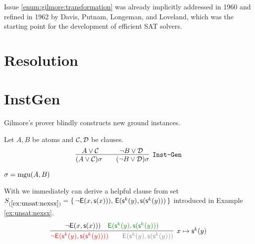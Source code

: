 Issue \ref{enum:gilmore:transformation} was already implicitly 
addressed in 1960 \cite{Davis:1960:CPQ:321033.321034}
and refined in 1962 \cite{Davis:1962:MPT:368273.368557}
by Davis, Putnam, Longeman, and Loveland, 
which was the starting point for the development of efficient SAT solvers.

\section{Resolution}

\section{InstGen}

Gilmore's prover blindly constructs new ground instances. 

\begin{definition}[\InstGen] Let $A, B$ be atoms and ${\mathcal C},{\mathcal D}$ be clauses.
	\begin{gather*}
	\infer
	[{\InstGen}] 
	{(A\lor\mathcal C)\sigma\qquad (\lnot B\lor\mathcal D)\sigma}
	{A\lor\mathcal C\quad&\quad \lnot B\lor\mathcal D}
	\end{gather*}
	\begin{center}$\sigma=\operatorname{mgu}(A,B)$
	\end{center}
\end{definition}

\begin{example}
	With \InstGen we immediately can derive a helpful clause from set
$S_{(\ref{ex:unsat:nexsx})} =
\{\,
{ \lnot{\mathsf{E}}(x, {\mathsf s}(x)))},\, 
{ {\mathsf{E}}({\mathsf s}^k(y), {\mathsf s}({\mathsf s}^k(y)))}
\,\}$ 
 introduced in Example \ref{ex:unsat:nexsx}. 
\begin{gather*}
\infer[x\mapsto\msucc^k(y)]{
	{\colLo \lnot\mE(\ms^k(y), \ms(\ms^k(y))))} \qquad
	{\colG \mE(\ms^k(y), \ms(\ms^k(y)))}
}{
	{ \lnot\mE(x, \ms(x)))} &
	{\colHi \mE(\ms^k(y), \ms(\ms^k(y)))}
}
\end{gather*}
	
\end{example}


